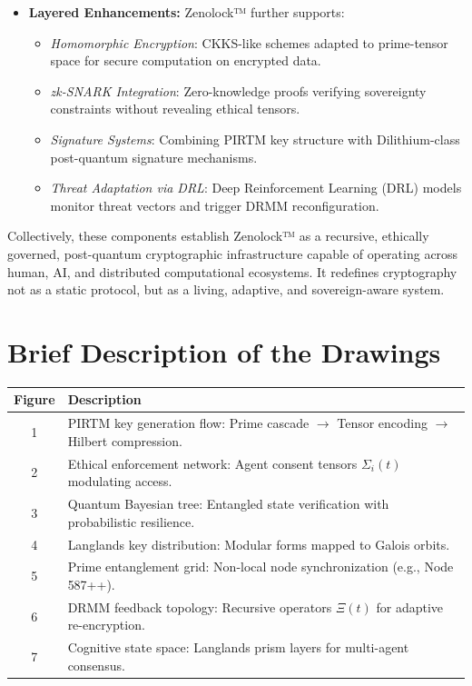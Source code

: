 \documentclass{article}
\theoremstyle{plain}
\begin{document}
\begin{itemize}
  \item \textbf{Layered Enhancements:} Zenolock™ further supports:
  \begin{itemize}
    \item \textit{Homomorphic Encryption}: CKKS-like schemes adapted to prime-tensor space for secure computation on encrypted data.
    \item \textit{zk-SNARK Integration}: Zero-knowledge proofs verifying sovereignty constraints without revealing ethical tensors.
    \item \textit{Signature Systems}: Combining PIRTM key structure with Dilithium-class post-quantum signature mechanisms.
    \item \textit{Threat Adaptation via DRL}: Deep Reinforcement Learning (DRL) models monitor threat vectors and trigger DRMM reconfiguration.
  \end{itemize}
\end{itemize}

Collectively, these components establish Zenolock™ as a recursive, ethically governed, post-quantum cryptographic infrastructure capable of operating across human, AI, and distributed computational ecosystems. It redefines cryptography not as a static protocol, but as a living, adaptive, and sovereign-aware system.

\section{Brief Description of the Drawings}

\begin{tabular}{|c|l|}
\hline
Figure & Description \\
\hline
1 & PIRTM key generation flow: Prime cascade $\rightarrow$ Tensor encoding $\rightarrow$ Hilbert compression. \\
2 & Ethical enforcement network: Agent consent tensors $\Sigma_i(t)$ modulating access. \\
3 & Quantum Bayesian tree: Entangled state verification with probabilistic resilience. \\
4 & Langlands key distribution: Modular forms mapped to Galois orbits. \\
5 & Prime entanglement grid: Non-local node synchronization (e.g., Node 587++). \\
6 & DRMM feedback topology: Recursive operators $\Xi(t)$ for adaptive re-encryption. \\
7 & Cognitive state space: Langlands prism layers for multi-agent consensus. \\
\hline
\end{tabular}
\end{document}
